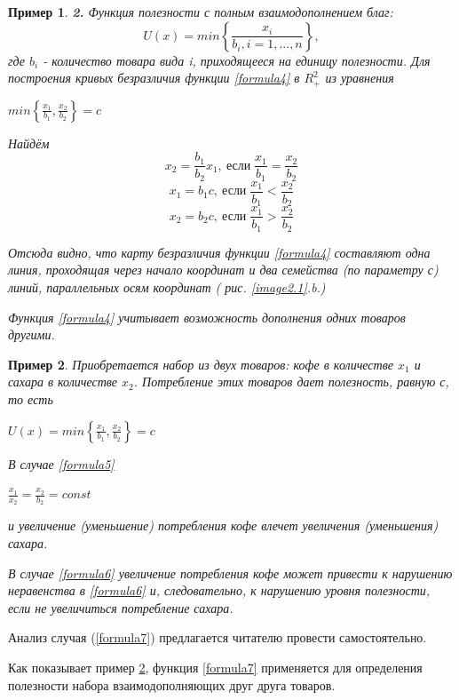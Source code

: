 \documentclass[12pt, 4paper]{book}
\newtheorem{example}{\indent \color{blue} Пример}[chapter]
\begin{document}
{\begin{example}
\textbf{2.} Функция полезности с полным взаимодополнением благ:
\begin{equation}
\label{formula4}
U(x)=min\left\{\frac{x_{i}}{b_{i},i=1,...,n}\right\},
\end{equation}
где $b_{i}$ - количество товара вида \textit{i}, приходящееся на единицу полезности. Для построения кривых безразличия функции \ref{formula4} в $R_{+}^{2}$ из уравнения 
\begin{center}
$min\left\{\frac{x_{1}}{b_{1}}, \frac{x_{2}}{b_{2}}\right\}=c$
\end{center}
\par
Найдём 
\begin{equation}
\label{formula5}
x_{2}=\frac{b_{1}}{b_{2}}x_{1}, \: \text{если} \; \frac{x_{1}}{b_{1}} = \frac{x_{2}}{b_{2}} 
\end{equation}
\begin{equation}
\label{formula6}
x_{1}=b_{1}c, \: \text{если} \; \frac{x_{1}}{b_{1}} < \frac{x_{2}}{b_{2}} 
\end{equation}
\begin{equation}
\label{formula7}
x_{2}=b_{2}c, \: \text{если} \; \frac{x_{1}}{b_{1}} > \frac{x_{2}}{b_{2}}
\end{equation}
\par

Отсюда видно, что карту безразличия функции \ref{formula4} составляют одна линия, проходящая через начало координат и два семейства (по параметру \textit{с}) линий, параллельных осям координат ( рис. \ref{image2.1}.b.)
\par

Функция \ref{formula4} учитывает возможность дополнения одних товаров другими.
\par
\end{example}
\begin{example}
\label{exam2.4}
\rm Приобретается набор из двух товаров: кофе в количестве $x_{1}$ и сахара в количестве $x_{2}$. Потребление этих товаров дает полезность, равную \textit{с}, то есть 
\begin{center}
$U(x)=min\left\{\frac{x_{1}}{b_{1}}, \frac{x_{2}}{b_{2}}\right\}=c$
\end{center}
\par
В случае \ref{formula5} 
\begin{center}
$\frac{x_{1}}{x_{2}}=\frac{x_{2}}{b_{2}}=const$
\end{center}
и увеличение (уменьшение) потребления кофе влечет увеличения (уменьшения) сахара. 
\par
В случае \ref{formula6} увеличение потребления кофе может привести к нарушению неравенства в \ref{formula6} и, следовательно, к нарушению уровня полезности, если не увеличиться потребление сахара.
\end{example}
Анализ случая (\ref{formula7}) предлагается читателю провести самостоятельно.
\par
Как показывает пример \ref{exam2.4}, функция \ref{formula7} применяется для определения полезности набора взаимодополняющих друг друга товаров.

}
\end{document}
